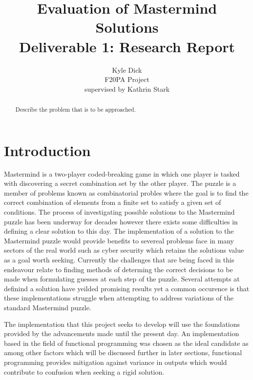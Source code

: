 \documentclass[12pt]{article}  %
\title{Evaluation of Mastermind Solutions\\
Deliverable 1: Research Report}
\author{Kyle Dick\\
F20PA Project\\
supervised by
Kathrin Stark}
\theoremstyle{definition}
\theoremstyle{remark}
\begin{document}
\maketitle

\newpage                     %
\begin{abstract}
Describe the problem that is to be approached.

\end{abstract}

\newpage                     %
\tableofcontents

\newpage                     %
\section{Introduction}\label{s:intro}
%
Mastermind is a two-player coded-breaking game in which one player is tasked with discovering a secret combination set by the other player.
The puzzle is a member of problems known as combinatorial probles where the goal is to find the correct combination of elements from a finite
set to satisfy a given set of conditions. The process of investigating possible solutions to the Mastermind puzzle has been underway for decades
however there exists some difficulties in defining a clear solution to this day. The implementation of a solution to the Mastermind puzzle would provide
benefits to severeal problems face in many sectors of the real world such as cyber security which retains the solutions value as a goal worth seeking.
Currently the challenges that are being faced in this endeavour relate to finding methods of determing the correct decisions to be made when formulating
guesses at each step of the puzzle. Several attempts at definind a solution have yeilded promising results yet a common occurence is that these
implementations struggle when attempting to address variations of the standard Mastermind puzzle.

The implementation that this project seeks to develop will use the foundations provided by the advancements made until the present day. An implementation
based in the field of functional programming was chosen as the ideal candidate as among other factors which will be discussed further in later sections,
functional programming provides mitigation against variance in outputs which would contribute to confusion when seeking a rigid solution.
\end{document}
